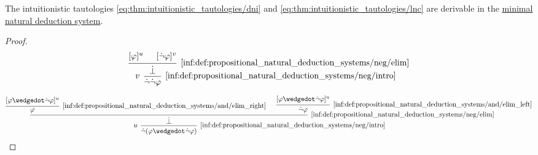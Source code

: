 \begin{proposition}\label{thm:syntactic_minimal_tautologies}
  The intuitionistic tautologies \eqref{eq:thm:intuitionistic_tautologies/dni} and \eqref{eq:thm:intuitionistic_tautologies/lnc} are derivable in the \hyperref[def:propositional_natural_deduction_systems]{minimal natural deduction system}.
\end{proposition}
\begin{proof}
  \begin{equation*}
    \begin{prooftree}
      \hypo{ [\varphi]^u }
      \hypo{ [\synneg \varphi]^v }
      \infer2[\ref{inf:def:propositional_natural_deduction_systems/neg/elim}]{ \synbot }
      \infer[left label=\( v \)]1[\ref{inf:def:propositional_natural_deduction_systems/neg/intro}]{ \synneg \synneg \varphi }
    \end{prooftree}
  \end{equation*}

  \begin{equation*}
    \begin{prooftree}
      \hypo{ [\varphi \synwedge \synneg \varphi]^u }
      \infer1[\ref{inf:def:propositional_natural_deduction_systems/and/elim_right}]{ \varphi }

      \hypo{ [\varphi \synwedge \synneg \varphi]^u }
      \infer1[\ref{inf:def:propositional_natural_deduction_systems/and/elim_left}]{ \synneg \varphi }

      \infer2[\ref{inf:def:propositional_natural_deduction_systems/neg/elim}]{ \synbot }

      \infer[left label=\( u \)]1[\ref{inf:def:propositional_natural_deduction_systems/neg/intro}]{ \synneg (\varphi \synwedge \synneg \varphi) }
    \end{prooftree}
  \end{equation*}
\end{proof}

